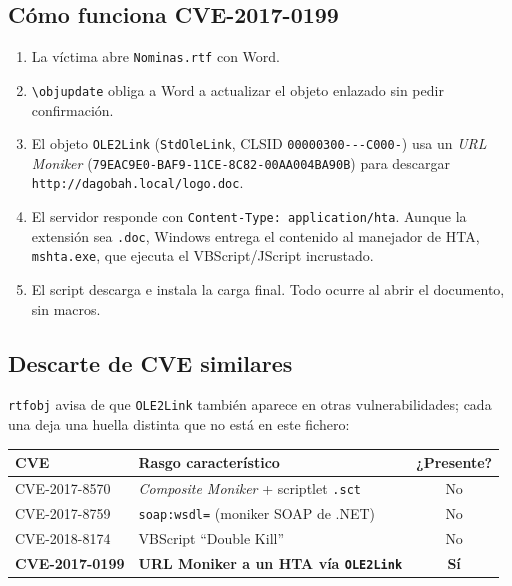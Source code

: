 \documentclass[11pt,a4paper]{article}
\newcommand{\bs}{\textbackslash\allowbreak{}}
\begin{document}
\subsection{Cómo funciona CVE-2017-0199}
\begin{enumerate}
  \item La víctima abre \texttt{Nominas.rtf} con Word.
  \item \texttt{\bs objupdate} obliga a Word a actualizar el objeto enlazado sin pedir confirmación.
  \item El objeto \texttt{OLE2Link} (\texttt{StdOleLink}, CLSID \texttt{00000300---\allowbreak C000-}) usa un
        \emph{URL Moniker} (\texttt{79EAC9E0-\allowbreak BAF9-\allowbreak 11CE-\allowbreak 8C82-\allowbreak 00AA004BA90B}) para descargar
        \texttt{http://dagobah.local/logo.doc}.
  \item El servidor responde con \texttt{Content-Type: application/hta}. Aunque la extensión sea \texttt{.doc}, Windows
        entrega el contenido al manejador de HTA, \texttt{mshta.exe}, que ejecuta el VBScript/JScript incrustado.
  \item El script descarga e instala la carga final. Todo ocurre al abrir el documento, sin macros.
\end{enumerate}

\subsection{Descarte de CVE similares}
\texttt{rtfobj} avisa de que \texttt{OLE2Link} también aparece en otras vulnerabilidades; cada una deja una huella
distinta que no está en este fichero:

\begin{tabularx}{\linewidth}{@{}lXc@{}}
\toprule
\textbf{CVE} & \textbf{Rasgo característico} & \textbf{¿Presente?} \\ \midrule
CVE-2017-8570 & \emph{Composite Moniker} + scriptlet \texttt{.sct} & No \\
CVE-2017-8759 & \texttt{soap:wsdl=} (moniker SOAP de .NET) & No \\
CVE-2018-8174 & VBScript ``Double Kill'' & No \\
\textbf{CVE-2017-0199} & \textbf{URL Moniker a un HTA vía \texttt{OLE2Link}} & \textbf{Sí} \\
\bottomrule
\end{tabularx}
\end{document}

